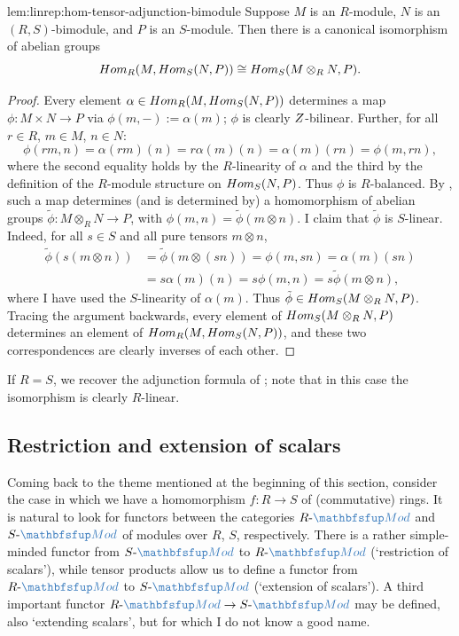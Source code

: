 \begin{lem}{}{lem:linrep:hom-tensor-adjunction-bimodule}
  Suppose $M$ is an $R$-module, $N$ is an $(R,S)$-bimodule, and $P$ is
  an $S$-module. Then there is a canonical isomorphism of abelian
  groups
  \[
    Hom_R(M, Hom_S(N, P)) \cong Hom_S(M \otimes_R N, P).
  \]
\end{lem}
\begin{proof}
  Every element $\alpha \in Hom_R(M, Hom_S(N, P))$ determines a map
  $\phi : M \times N \to P$ via $\phi(m, \mathord{-}) := \alpha(m)$;
  $\phi$ is clearly $Z$-bilinear. Further, for all $r \in R$,
  $m \in M$, $n \in N$:
  \[
    \phi(rm, n) = \alpha(rm)(n) = r\alpha(m)(n) = \alpha(m)(rn) =
    \phi(m, rn),
  \]
  where the second equality holds by the $R$-linearity of $\alpha$ and
  the third by the definition of the $R$-module structure on
  $Hom_S(N, P)$. Thus $\phi$ is $R$-balanced. By
  ,
  such a map determines (and is determined by) a homomorphism of
  abelian groups $\tilde\phi : M \otimes_R N \to P$, with
  $\phi(m, n) = \tilde\phi(m \otimes n)$. I claim that $\tilde\phi$ is
  $S$-linear. Indeed, for all $s \in S$ and all pure tensors
  $m \otimes n$,
  \begin{align*}
    \tilde\phi(s(m \otimes n))
    &= \tilde\phi(m \otimes (sn))
      = \phi(m, sn) = \alpha(m)(sn) \\
    &= s\alpha(m)(n) = s\phi(m, n) = s\tilde\phi(m \otimes n),
  \end{align*}
  where I have used the $S$-linearity of $\alpha(m)$. Thus
  $\tilde\phi \in Hom_S(M \otimes_R N, P)$. Tracing the argument
  backwards, every element of $Hom_S(M \otimes_R N, P)$ determines an
  element of $Hom_R(M, Hom_S(N, P))$, and these two correspondences
  are clearly inverses of each other.
\end{proof}

If $R = S$, we recover the adjunction formula of
;
note that in this case the isomorphism is clearly $R$-linear.

\subsection{Restriction and extension of scalars}%
\label{subsec:linrep:restriction-and-extension-of-scalars}
Coming back to the theme mentioned at the beginning of this section,
consider the case in which we have a homomorphism $f : R \to S$ of
(commutative) rings. It is natural to look for functors between the
categories $R\text{-}\categ{Mod}$ and $S\text{-}\categ{Mod}$ of
modules over $R$, $S$, respectively. There is a rather simple-minded
functor from $S\text{-}\categ{Mod}$ to $R\text{-}\categ{Mod}$
(`restriction of scalars'), while tensor products allow us to define a
functor from $R\text{-}\categ{Mod}$ to $S\text{-}\categ{Mod}$
(`extension of scalars'). A third important functor
$R\text{-}\categ{Mod} \to S\text{-}\categ{Mod}$ may be defined, also
`extending scalars', but for which I do not know a good name.

